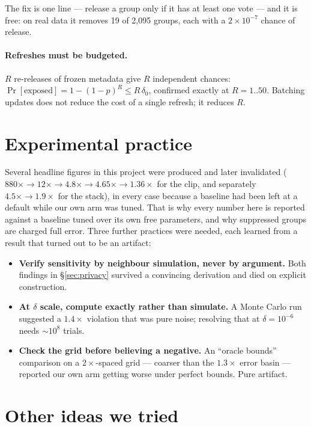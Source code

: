\documentclass[11pt,a4paper]{article}
\begin{document}
The fix is one line --- release a group only if it has at least one vote --- and it is free: on real
data it removes 19 of 2,095 groups, each with a $2\times10^{-7}$ chance of release.

\paragraph{Refreshes must be budgeted.} $R$ re-releases of frozen metadata give $R$ independent
chances: $\Pr[\text{exposed}] = 1-(1-p)^R \le R\,\delta_0$, confirmed exactly at $R = 1..50$.
Batching updates does not reduce the cost of a single refresh; it reduces $R$.

\section{Experimental practice}\label{sec:method}

Several headline figures in this project were produced and later invalidated
($880\times \to 12\times \to 4.8\times \to 4.65\times \to 1.36\times$ for the clip, and separately
$4.5\times \to 1.9\times$ for the stack), in every case because a baseline had been left at a
default while our own arm was tuned. That is why every number here is reported against a baseline
tuned over its own free parameters, and why suppressed groups are charged full error. Three further
practices were needed, each learned from a result that turned out to be an artifact:

\begin{itemize}
\item \textbf{Verify sensitivity by neighbour simulation, never by argument.} Both findings in
\S\ref{sec:privacy} survived a convincing derivation and died on explicit construction.
\item \textbf{At $\delta$ scale, compute exactly rather than simulate.} A Monte Carlo run suggested
a $1.4\times$ violation that was pure noise; resolving that at $\delta=10^{-6}$ needs $\sim10^8$
trials.
\item \textbf{Check the grid before believing a negative.} An ``oracle bounds'' comparison on a
$2\times$-spaced grid --- coarser than the $1.3\times$ error basin --- reported our own arm getting
worse under perfect bounds. Pure artifact.
\end{itemize}

\section{Other ideas we tried}\label{sec:other}
\end{document}
